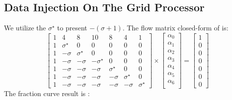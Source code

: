 \subsection{Data Injection On The Grid Processor}
We utilize the $\sigma^{\star}$ to present $-(\sigma+1)$.  
The flow matrix closed-form of  is:
\begin{equation}
{
\left[ \begin{array}{ccccccc}
1 & 4 & 8 & 10 & 8 & 4 & 1\\
1 & \sigma^{\star} & 0 & 0 & 0 & 0 & 0\\
1 & -\sigma & \sigma^{\star} & 0 & 0 & 0 & 0\\
1 & -\sigma & -\sigma & -\sigma^{\star} & 0 & 0 & 0\\
1 & -\sigma & -\sigma & -\sigma & \sigma^{\star} & 0 & 0\\
1 & -\sigma & -\sigma & -\sigma & -\sigma & \sigma^{\star} & 0\\
1 & -\sigma & -\sigma & -\sigma & -\sigma & -\sigma & \sigma^{\star}
\end{array} 
\right ]} \times \left[ \begin{array}{c}
\alpha_{0} \\
\alpha_{1} \\
\alpha_{2} \\
\alpha_{3} \\
\alpha_{4}\\
\alpha_{5}\\
\alpha_{6}\\
\end{array} 
\right ] = \left[ \begin{array}{c}
1 \\
0 \\
0 \\
0 \\
0\\
0\\
0
\end{array} 
\right ]
\end{equation}
The fraction curve result is :

